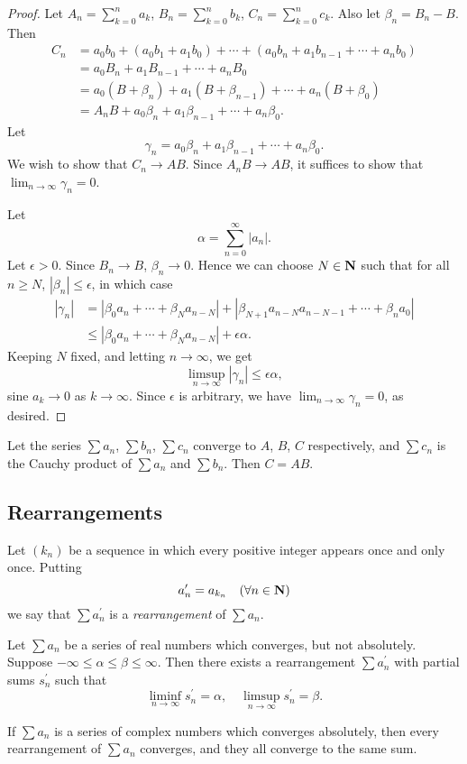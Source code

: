 \begin{proof}
Let $\displaystyle A_n=\sum_{k=0}^{n}a_k$, $\displaystyle B_n=\sum_{k=0}^{n}b_k$, $\displaystyle C_n=\sum_{k=0}^{n}c_k$. Also let $\beta_n=B_n-B$. Then 
\begin{align*}
C_n&=a_0b_0+(a_0b_1+a_1b_0)+\cdots+(a_0b_n+a_1b_{n-1}+\cdots+a_nb_0)\\
&=a_0B_n+a_1B_{n-1}+\cdots+a_nB_0\\
&=a_0(B+\beta_n)+a_1(B+\beta_{n-1})+\cdots+a_n(B+\beta_0)\\
&=A_nB+a_0\beta_n+a_1\beta_{n-1}+\cdots+a_n\beta_0.
\end{align*}
Let
\[\gamma_n=a_0\beta_n+a_1\beta_{n-1}+\cdots+a_n\beta_0.\]
We wish to show that $C_n\to AB$. Since $A_nB\to AB$, it suffices to show that $\displaystyle\lim_{n\to\infty}\gamma_n=0$.

Let 
\[\alpha=\sum_{n=0}^{\infty}|a_n|.\]
Let $\epsilon>0$. Since $B_n\to B$, $\beta_n\to0$. Hence we can choose $N\in\mathbf N$ such that for all $n\ge N$, $|\beta_n|\le\epsilon$, in which case
\begin{align*}
|\gamma_n|&=|\beta_0a_n+\cdots+\beta_Na_{n-N}|+|\beta_{N+1}a_{n-N}a_{n-N-1}+\cdots+\beta_na_0|\\
&\le|\beta_0a_n+\cdots+\beta_Na_{n-N}|+\epsilon\alpha.
\end{align*}
Keeping $N$ fixed, and letting $n\to\infty$, we get
\[\limsup_{n\to\infty}|\gamma_n|\le\epsilon\alpha,\]
sine $a_k\to0$ as $k\to\infty$. Since $\epsilon$ is arbitrary, we have $\displaystyle\lim_{n\to\infty}\gamma_n=0$, as desired.
\end{proof}

\begin{theorem}[Abel]
Let the series $\sum a_n$, $\sum b_n$, $\sum c_n$ converge to $A$, $B$, $C$ respectively, and $\sum c_n$ is the Cauchy product of $\sum a_n$ and $\sum b_n$. Then $C=AB$.
\end{theorem}

\subsection{Rearrangements}
\begin{definition}[Rearrangement]
Let $(k_n)$ be a sequence in which every positive integer appears once and only once. Putting
\[a_n^\prime=a_{k_n}\quad(\forall n\in\mathbf N)\]
we say that $\sum a_n^\prime$ is a \emph{rearrangement} of $\sum a_n$.
\end{definition}

\begin{proposition}
Let $\sum a_n$ be a series of real numbers which converges, but not absolutely. Suppose $-\infty\le\alpha\le\beta\le\infty$. Then there exists a rearrangement $\sum a_n^\prime$ with partial sums $s_n^\prime$ such that
\[\liminf_{n\to\infty}s_n^\prime=\alpha,\quad\limsup_{n\to\infty}s_n^\prime=\beta.\]
\end{proposition}

\begin{proposition}
If $\sum a_n$ is a series of complex numbers which converges absolutely, then every rearrangement of $\sum a_n$ converges, and they all converge to the same sum.
\end{proposition}